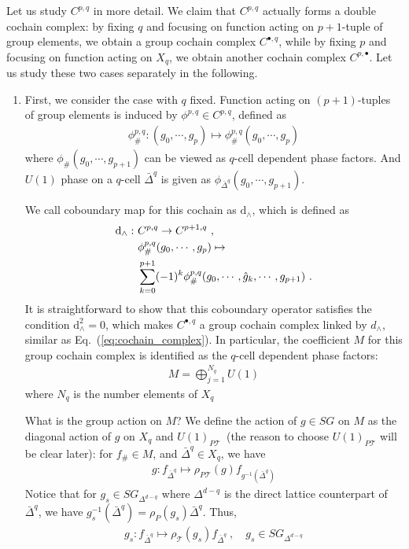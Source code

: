 \documentclass[%
  reprint,
  amsmath,amssymb,
  aps,pra,
]{revtex4-1}
\newcommand{\dd}{\mathrm{d}} %
\newcommand{\TT}{\mathcal{T}} %
\begin{document}
Let us study $C^{p,q}$ in more detail.
We claim that $C^{p,q}$ actually forms a double cochain complex: by fixing $q$ and focusing on function acting on $p+1$-tuple of group elements, we obtain a group cochain complex $C^{\bullet,q}$, while by fixing $p$ and focusing on function acting on $X_q$, we obtain another cochain complex $C^{p,\bullet}$.
Let us study these two cases separately in the following.
\begin{enumerate}
  \item First, we consider the case with $q$ fixed. 
    Function acting on $(p+1)$-tuples of group elements is induced by $\phi^{p,q}\in C^{p,q}$, defined as
    \begin{align}
      \phi^{p,q}_\#:(g_0,\cdots,g_{p})\mapsto \phi^{p,q}_{\#}(g_0,\cdots,g_{p})
      \label{}
    \end{align}
    where $\phi_{\#}(g_0,\cdots,g_{p+1})$ can be viewed as $q$-cell dependent phase factors.
    And $U(1)$ phase on a $q$-cell $\bar{\Delta}^q$ is given as $\phi_{\bar{\Delta}^q}(g_0,\cdots,g_{p+1})$.

    We call coboundary map for this cochain as $\dd_\wedge$, which is defined as
    \begin{align}
      \dd_\wedge:~& C^{p,q}\rightarrow C^{p+1,q}~,\notag\\
      &\phi_{\#}^{p,q}(g_0,\cdots,g_{p})\mapsto\notag\\
      &\sum_{k=0}^{p+1}(-1)^k\phi^{p,q}_{\#}(g_0,\cdots,\hat{g}_k,\cdots,g_{p+1})~.
      \label{eq:double_complex_vertical_d}
    \end{align}
    It is straightforward to show that this coboundary operator satisfies the condition $\dd_\wedge^2=0$, which makes $C^{\bullet,q}$ a group cochain complex linked by $d_\wedge$, similar as Eq.~(\ref{eq:cochain_complex}).
    In particular, the coefficient $M$ for this group cochain complex is identified as the $q$-cell dependent phase factors:
    \begin{align}
      M=\bigoplus_{j=1}^{N_q} U(1)
      \label{eq:eqv_cohomology_coeff}
    \end{align}
    where $N_q$ is the number elements of $X_q$

    What is the group action on $M$?
    We define the action of $g\in SG$ on $M$ as the diagonal action of $g$ on $X_q$ and $U(1)_{P\TT}$~(the reason to choose $U(1)_{P\TT}$ will be clear later): for $f_{\#}\in M$, and $\bar{\Delta}^q\in X_q$, we have
    \begin{align}
      g:f_{\bar{\Delta}^q}\mapsto \rho_{P\TT}(g)f_{g^{-1}(\bar{\Delta}^q)}
      \label{eq:eqv_cohomology_coeff_sym_act}
    \end{align}
    Notice that for $g_s\in SG_{\Delta^{d-q}}$ where $\Delta^{d-q}$ is the direct lattice counterpart of $\bar{\Delta}^q$, we have $g_s^{-1}(\bar{\Delta}^q)=\rho_P(g_s)\bar{\Delta}^q$.
    Thus, 
    \begin{align}
      g_s:f_{\bar{\Delta}^q}\mapsto\rho_\TT(g_s)f_{\bar{\Delta}^q}~,\quad g_s\in SG_{\Delta^{d-q}}
      \label{eq:eqv_cohomology_local_coeff_sym_act}
    \end{align}


\end{enumerate}
\end{document}
